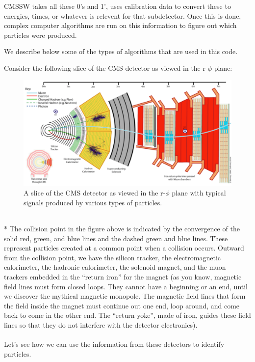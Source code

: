 CMSSW takes all these 0's and 1', uses calibration data to convert these to energies, times, or whatever is relevent for that subdetector.  Once this is done,   complex computer algorithms are run on this information to figure out which particles were produced.  

We describe below some of the types of algorithms that are used in this code.


\newpage \noindent
Consider the following slice of the CMS detector as viewed in the r-$\phi$ plane: 
\begin{figure}[h]
\centering\includegraphics[scale=0.6]{./particleID/Pictures/fig1.pdf}
\caption{A slice of the CMS detector as viewed in the r-$\phi$ plane with typical signals produced by various types of particles. }
\label{fig:pdgdedx}
\end{figure} 
\\*
The collision point in the figure above is indicated by the convergence of the solid red, green, and blue lines and the dashed green and blue lines.  These represent particles created at a common point when a collision occurs.  Outward from the collision point, we have the silicon tracker, the electromagnetic calorimeter, the hadronic calorimeter, the solenoid magnet, and the muon trackers embedded in the ``return iron'' for the magnet (as you know, magnetic field lines must form closed loops. They cannot have a beginning or an end, until we discover the mythical magnetic monopole. The magnetic field lines that form the field inside the magnet must continue out one end, loop around, and come back to come in the other end. The ``return yoke'', made of iron, guides these field lines so that they do not interfere with the detector electronics).  
\\
\\
\noindent
Let's see how we can use the information from these detectors to identify particles.
